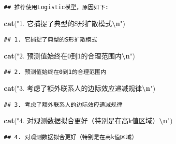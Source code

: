 \documentclass[
]{article}
\newenvironment{Shaded}{\begin{snugshade}}{\end{snugshade}}
\newcommand{\FunctionTok}[1]{\textcolor[rgb]{0.13,0.29,0.53}{\textbf{#1}}}
\newcommand{\NormalTok}[1]{#1}
\newcommand{\SpecialCharTok}[1]{\textcolor[rgb]{0.81,0.36,0.00}{\textbf{#1}}}
\newcommand{\StringTok}[1]{\textcolor[rgb]{0.31,0.60,0.02}{#1}}
\begin{document}
\begin{verbatim}
## 推荐使用Logistic模型，原因如下:
\end{verbatim}

\begin{Shaded}
\begin{Highlighting}[]
\FunctionTok{cat}\NormalTok{(}\StringTok{"1. 它捕捉了典型的S形扩散模式}\SpecialCharTok{\textbackslash{}n}\StringTok{"}\NormalTok{)}
\end{Highlighting}
\end{Shaded}

\begin{verbatim}
## 1. 它捕捉了典型的S形扩散模式
\end{verbatim}

\begin{Shaded}
\begin{Highlighting}[]
\FunctionTok{cat}\NormalTok{(}\StringTok{"2. 预测值始终在0到1的合理范围内}\SpecialCharTok{\textbackslash{}n}\StringTok{"}\NormalTok{)}
\end{Highlighting}
\end{Shaded}

\begin{verbatim}
## 2. 预测值始终在0到1的合理范围内
\end{verbatim}

\begin{Shaded}
\begin{Highlighting}[]
\FunctionTok{cat}\NormalTok{(}\StringTok{"3. 考虑了额外联系人的边际效应递减规律}\SpecialCharTok{\textbackslash{}n}\StringTok{"}\NormalTok{)}
\end{Highlighting}
\end{Shaded}

\begin{verbatim}
## 3. 考虑了额外联系人的边际效应递减规律
\end{verbatim}

\begin{Shaded}
\begin{Highlighting}[]
\FunctionTok{cat}\NormalTok{(}\StringTok{"4. 对观测数据拟合更好（特别是在高k值区域）}\SpecialCharTok{\textbackslash{}n}\StringTok{"}\NormalTok{)}
\end{Highlighting}
\end{Shaded}

\begin{verbatim}
## 4. 对观测数据拟合更好（特别是在高k值区域）
\end{verbatim}
\end{document}
